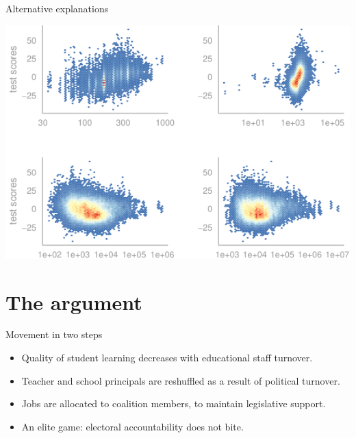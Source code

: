 \documentclass[
  ignorenonframetext,
]{beamer}
\providecommand{\tightlist}{%
  \setlength{\itemsep}{0pt}\setlength{\parskip}{0pt}}
\begin{document}
\begin{frame}{Alternative explanations}
\protect\hypertarget{alternative-explanations}{}

\begin{center}\includegraphics{presentation_plas_11-14-19_files/figure-beamer/unnamed-chunk-7-1} \end{center}

\end{frame}

\hypertarget{the-argument}{%
\section{The argument}\label{the-argument}}

\begin{frame}{Movement in two steps}
\protect\hypertarget{movement-in-two-steps}{}

\begin{itemize}
\tightlist
\item
  Quality of student learning decreases with educational staff turnover.
\item
  Teacher and school principals are reshuffled as a result of political
  turnover.
\item
  Jobs are allocated to coalition members, to maintain legislative
  support.
\item
  An elite game: electoral accountability does not bite.
\end{itemize}

\end{frame}
\end{document}
